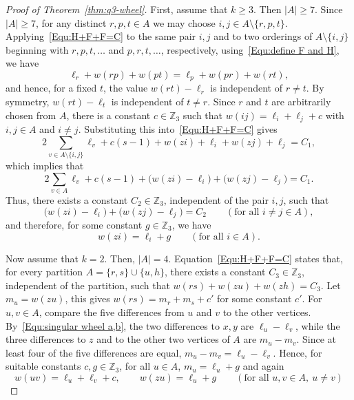 \documentclass[10pt,a4paper]{amsart}
\newcommand{\Z}{\mathbb Z}
\begin{document}
\begin{proof}[Proof of Theorem~\ref{thm:q3-wheel}]
    First, assume that $k\ge3$.
    Then $|A|\ge7$.
    Since $|A|\ge7$, for any distinct $r,p,t\in A$ we may choose $i,j\in A\setminus\{r,p,t\}$.  Applying~\eqref{Equ:H+F+F=C} to the same pair $i,j$ and to two orderings of $A\setminus\{i,j\}$ beginning with $r,p,t,\ldots$ and $p,r,t,\ldots$, respectively, using~\eqref{Equ:define F and H}, we have
    \[
        \ell_r+w(rp)+w(pt)=\ell_p+w(pr)+w(rt),
    \]
    and hence, for a fixed $t$, the value $w(rt)-\ell_r$ is independent of $r\ne t$.
    By symmetry, $w(rt)-\ell_t$ is independent of $t\ne r$.
    Since $r$ and $t$ are arbitrarily chosen from $A$, there is a constant $c\in\Z_3$ such that $w(ij)=\ell_i+\ell_j+c$ with $i,j\in A$ and $i\ne j$.
    Substituting this into~\eqref{Equ:H+F+F=C} gives
    \begin{equation*}
        2\sum_{v\in A\setminus\{i,j\}}\ell_v+c(s-1)+w(zi)+\ell_i+w(zj)+\ell_j=C_1,
    \end{equation*}
    which implies that
    \begin{equation*}
        2\sum_{v\in A}\ell_v+c(s-1)+\bigl(w(zi)-\ell_i\bigr)+
        \bigl(w(zj)-\ell_j\bigr)=C_1.
    \end{equation*}
    Thus, there exists a constant $C_2\in \Z_3$, independent of the pair $i,j$, such that
    \[
        \bigl(w(zi)-\ell_i\bigr)+\bigl(w(zj)-\ell_j\bigr)=C_2
        \qquad(\text{for all }i\ne j\in A),
    \]
    and therefore, for some constant $g\in\Z_3$, we have
    \[
        w(zi)=\ell_i+g \qquad (\text{for all }i\in A).
    \]

    Now assume that $k=2$.
    Then, $|A|=4$.
    Equation~\eqref{Equ:H+F+F=C} states that, for every partition $A=\{r,s\}\cup\{u,h\}$, there exists a constant $C_3\in \Z_3$, independent of the partition, such that $w(rs)+w(zu)+w(zh)=C_3$.
    Let $m_u=w(zu)$, this gives $w(rs)=m_r+m_s+c'$ for some constant $c'$.
    For $u,v\in A$, compare the five differences from $u$ and $v$ to the other vertices.
    By~\eqref{Equ:singular wheel a,b}, the two differences to $x,y$ are $\ell_u-\ell_v$, while the three differences to $z$ and to the other two vertices of $A$ are $m_u-m_v$.
    Since at least four of the five differences are equal, $m_u-m_v=\ell_u-\ell_v$.
    Hence, for suitable constants $c,g\in\Z_3$, for all $u\in A$, $m_u=\ell_u+g$ and again
    \[
        w(uv)=\ell_u+\ell_v+c,
        \qquad
        w(zu)=\ell_u+g
        \qquad(\text{for all } u,v\in A,\ u\ne v)
    \]



\end{proof}
\end{document}
